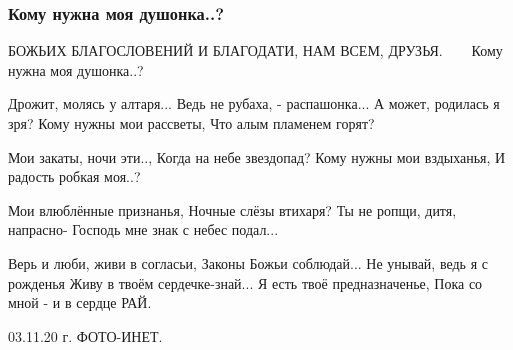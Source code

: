  
 
 

\subsubsection{Кому нужна моя душонка..?}
\label{sec:poetry.rus.taisia_vakulenko.dushonka}

БОЖЬИХ БЛАГОСЛОВЕНИЙ И БЛАГОДАТИ,
НАМ ВСЕМ, ДРУЗЬЯ. 🙏🙏🙏🙏🙏
Кому нужна моя душонка..?

Дрожит, молясь у алтаря...
Ведь не рубаха, - распашонка...
А может, родилась я зря?
Кому нужны мои рассветы,
Что алым пламенем горят?

Мои закаты, ночи эти..,
Когда на небе звездопад?
Кому нужны мои вздыханья,
И радость робкая моя..?

Мои влюблённые признанья,
Ночные слёзы втихаря?
Ты не ропщи, дитя, напрасно-
Господь мне знак с небес подал...

Верь и люби, живи в согласьи,
Законы Божьи соблюдай...
Не унывай, ведь я с рожденья
Живу в твоём сердечке-знай...
Я есть твоё предназначенье,
Пока со мной - и в сердце РАЙ.

03.11.20 г.
ФОТО-ИНЕТ.
